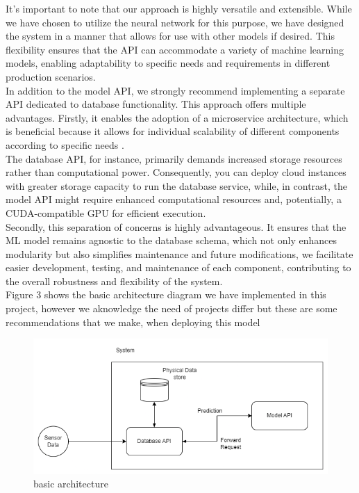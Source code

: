 \documentclass{article}
\begin{document}
It's important to note that our approach is highly versatile and extensible. While we have chosen to utilize the neural network for this purpose, we have designed the system in a manner that allows for use with other models if desired. This flexibility ensures that the API can accommodate a variety of machine learning models, enabling adaptability to specific needs and requirements in different production scenarios.\\

In addition to the model API, we strongly recommend implementing a separate API dedicated to database functionality. This approach offers multiple advantages. Firstly, it enables the adoption of a microservice architecture, which is beneficial because it allows for individual scalability of different components according to specific needs \cite{Patel2021}. \\

The database API, for instance, primarily demands increased storage resources rather than computational power. Consequently, you can deploy cloud instances with greater storage capacity to run the database service, while, in contrast, the model API might require enhanced computational resources and, potentially, a CUDA-compatible GPU for efficient execution.\\

Secondly, this separation of concerns is highly advantageous. It ensures that the ML model remains agnostic to the database schema, which not only enhances modularity but also simplifies maintenance and future modifications, we facilitate easier development, testing, and maintenance of each component, contributing to the overall robustness and flexibility of the system. \\

Figure 3 shows the basic architecture diagram we have implemented in this project, however we aknowledge the need of projects differ but these are some recommendations that we make, when deploying this model

\begin{figure}
    \centering
    \includegraphics[width=1\linewidth]{architecture_basic.png}
    \caption{basic architecture}
    \label{fig:architecture}
\end{figure}
\end{document}
